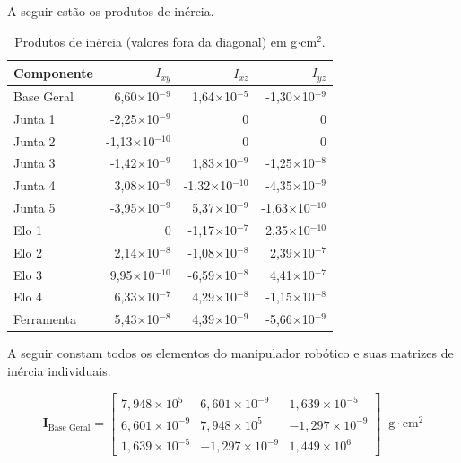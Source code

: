 A seguir estão os produtos de inércia.
\begin{table}[ht]
\centering
\caption{Produtos de inércia (valores fora da diagonal) em g$\cdot$cm$^{2}$.}
\label{tab:inercias_prod_gcm2}
\begin{tabular}{l rrr}
\hline
\textbf{Componente} & $I_{xy}$ & $I_{xz}$ & $I_{yz}$ \\
\hline
Base Geral   & 6,60$\times$10$^{-9}$   & 1,64$\times$10$^{-5}$   & -1,30$\times$10$^{-9}$ \\
Junta 1      & -2,25$\times$10$^{-9}$  & 0         & 0        \\
Junta 2      & -1,13$\times$10$^{-10}$ & 0         & 0        \\
Junta 3      & -1,42$\times$10$^{-9}$  & 1,83$\times$10$^{-9}$   & -1,25$\times$10$^{-8}$ \\
Junta 4      & 3,08$\times$10$^{-9}$   & -1,32$\times$10$^{-10}$ & -4,35$\times$10$^{-9}$ \\
Junta 5      & -3,95$\times$10$^{-9}$  & 5,37$\times$10$^{-9}$   & -1,63$\times$10$^{-10}$ \\
Elo 1        & 0         & -1,17$\times$10$^{-7}$  & 2,35$\times$10$^{-10}$ \\
Elo 2        & 2,14$\times$10$^{-8}$   & -1,08$\times$10$^{-8}$  & 2,39$\times$10$^{-7}$ \\
Elo 3        & 9,95$\times$10$^{-10}$  & -6,59$\times$10$^{-8}$  & 4,41$\times$10$^{-7}$ \\
Elo 4        & 6,33$\times$10$^{-7}$   & 4,29$\times$10$^{-8}$   & -1,15$\times$10$^{-8}$ \\
Ferramenta   & 5,43$\times$10$^{-8}$   & 4,39$\times$10$^{-9}$   & -5,66$\times$10$^{-9}$ \\
\hline
\end{tabular}
\end{table}

A seguir constam todos os elementos do manipulador robótico e suas matrizes de inércia individuais.

\begin{equation}
\mathbf{I}_{\text{Base Geral}} =
\begin{bmatrix}
7,948\times 10^{5} & 6,601\times 10^{-9} & 1,639\times 10^{-5} \\
6,601\times 10^{-9} & 7,948\times 10^{5} & -1,297\times 10^{-9} \\
1,639\times 10^{-5} & -1,297\times 10^{-9} & 1,449\times 10^{6}
\end{bmatrix} \;\; \text{g$\cdot$cm$^{2}$}
\end{equation}


